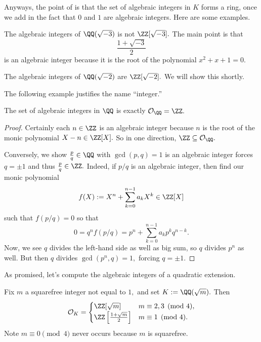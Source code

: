 \documentclass[../notes.tex]{subfiles}
\begin{document}
Anyways, the point of is that the set of algebraic integers in $K$ forms a ring, once we add in the fact that $0$ and $1$ are algebraic integers. Here are some examples.
\begin{ex}
	The algebraic integers of $\QQ(\sqrt{-3})$ is not $\ZZ[\sqrt{-3}].$ The main point is that
	\[\frac{1+\sqrt{-3}}2\]
	is an algebraic integer because it is the root of the polynomial $x^2+x+1=0.$ 
\end{ex}
\begin{example}
	The algebraic integers of $\QQ(\sqrt{-2})$ are $\ZZ[\sqrt{-2}].$ We will show this shortly.
\end{example}
The following example justifies the name ``integer.''
\begin{exe}
	The set of algebraic integers in $\QQ$ is exactly $\mathcal O_\QQ=\ZZ.$
\end{exe}
\begin{proof}
	Certainly each $n\in\ZZ$ is an algebraic integer because $n$ is the root of the monic polynomial $X-n\in\ZZ[X].$ So in one direction, $\ZZ\subseteq\mathcal O_\QQ.$
	
	Conversely, we show $\frac pq\in\QQ$ with $\gcd(p,q)=1$ is an algebraic integer forces $q=\pm1$ and thus $\frac pq\in\ZZ.$ Indeed, if $p/q$ is an algebraic integer, then find our monic polynomial
	\[f(X):=X^n+\sum_{k=0}^{n-1}a_kX^k\in\ZZ[X]\]
	such that $f(p/q)=0$ so that
	\[0=q^nf(p/q)=p^n+\sum_{k=0}^{n-1}a_kp^kq^{n-k}.\]
	Now, we see $q$ divides the left-hand side as well as big sum, so $q$ divides $p^n$ as well. But then $q$ divides $\gcd\left(p^n,q\right)=1,$ forcing $q=\pm1.$
\end{proof}
As promised, let's compute the algebraic integers of a quadratic extension.
\begin{exe}
	Fix $m$ a squarefree integer not equal to $1,$ and set $K:=\QQ(\sqrt m).$ Then
	\[\mathcal O_K=\begin{cases}
		\ZZ[\sqrt m] & m\equiv2,3\pmod4, \\
		\ZZ\left[\frac{1+\sqrt m}2\right] & m\equiv1\pmod4.
	\end{cases}\]
	Note $m\equiv0\pmod4$ never occurs because $m$ is squarefree.
\end{exe}
\end{document}
